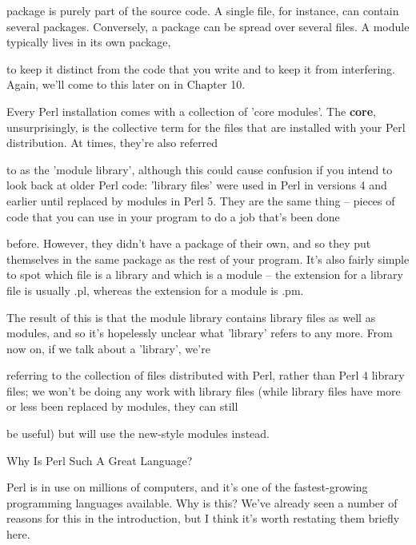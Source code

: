 \documentclass[a4paper,11pt]{book}
\begin{document}
\noindent package is purely part of the source  code.  A  single  file,  for  instance,  can  contain  several  packages. Conversely,  a package  can be  spread  over  several  files.  A  module  typically  lives  in  its  own  package,

\noindent to  keep  it  distinct from the code  that  you  write  and  to  keep  it  from  interfering.  Again,  we'll  come to this  later on in  Chapter 10.

\noindent 

\noindent Every Perl installation comes with a collection of 'core modules'. The \textbf{core}, unsurprisingly, is the collective term for the files that are installed with your Perl distribution. At times, they're also referred

\noindent to as the 'module library', although this could cause confusion if you intend to look back at older Perl code: 'library files' were used in Perl in versions 4 and earlier until replaced by modules in Perl 5. They are the same thing -- pieces of code that you can use in your program to do a job that's been done

\noindent before. However, they didn't have a package of their own, and so they put themselves in the same package as the rest of your program. It's also fairly simple to spot which file is a library and which is a module -- the extension for a library file is usually .pl, whereas the extension for a module is .pm.

\noindent 

\noindent The result of this is that the module library contains library files as well as modules, and so it's hopelessly unclear what 'library' refers to any more. From now on, if we talk about a 'library', we're

\noindent referring to the collection of files distributed with Perl, rather than Perl 4 library files; we won't be doing any work with library files (while library files have more or less been replaced by modules, they can still

\noindent be useful) but will use the new-style modules instead.

\noindent 

\noindent 

\noindent Why Is Perl Such A Great Language?

\noindent Perl is in use on millions of computers, and it's one of the fastest-growing programming languages available. Why is this? We've already seen a number of reasons for this in the introduction, but I think it's worth restating them briefly here.
\end{document}
